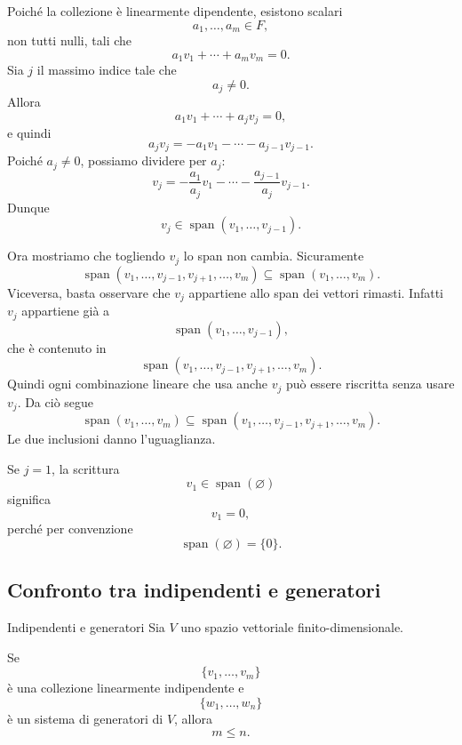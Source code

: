 \documentclass[a4paper]{article}
\begin{document}
\begin{snippetproof}{}
    Poiché la collezione è linearmente dipendente, esistono scalari
    \[
        a_1,\ldots,a_m\in F,
    \]
    non tutti nulli, tali che
    \[
        a_1v_1+\cdots+a_mv_m=0.
    \]
    Sia \(j\) il massimo indice tale che
    \[
        a_j\neq 0.
    \]
    Allora
    \[
        a_1v_1+\cdots+a_jv_j=0,
    \]
    e quindi
    \[
        a_jv_j=-a_1v_1-\cdots-a_{j-1}v_{j-1}.
    \]
    Poiché \(a_j\neq 0\), possiamo dividere per \(a_j\):
    \[
        v_j
        =
        -\frac{a_1}{a_j}v_1-\cdots-\frac{a_{j-1}}{a_j}v_{j-1}.
    \]
    Dunque
    \[
        v_j\in\operatorname{span}(v_1,\ldots,v_{j-1}).
    \]

    Ora mostriamo che togliendo \(v_j\) lo span non cambia. Sicuramente
    \[
        \operatorname{span}(v_1,\ldots,v_{j-1},v_{j+1},\ldots,v_m)
        \subseteq
        \operatorname{span}(v_1,\ldots,v_m).
    \]
    Viceversa, basta osservare che \(v_j\) appartiene allo span dei vettori rimasti. Infatti \(v_j\) appartiene già a
    \[
        \operatorname{span}(v_1,\ldots,v_{j-1}),
    \]
    che è contenuto in
    \[
        \operatorname{span}(v_1,\ldots,v_{j-1},v_{j+1},\ldots,v_m).
    \]
    Quindi ogni combinazione lineare che usa anche \(v_j\) può essere riscritta senza usare \(v_j\). Da ciò segue
    \[
        \operatorname{span}(v_1,\ldots,v_m)
        \subseteq
        \operatorname{span}(v_1,\ldots,v_{j-1},v_{j+1},\ldots,v_m).
    \]
    Le due inclusioni danno l'uguaglianza.
\end{snippetproof}

Se \(j=1\), la scrittura
\[
    v_1\in\operatorname{span}(\varnothing)
\]
significa
\[
    v_1=0,
\]
perché per convenzione
\[
    \operatorname{span}(\varnothing)=\{0\}.
\]

\subsection{Confronto tra indipendenti e generatori}

\begin{snippettheorem}{Indipendenti e generatori}
    Sia \(V\) uno spazio vettoriale finito-dimensionale.

    Se
    \[
        \{v_1,\ldots,v_m\}
    \]
    è una collezione linearmente indipendente e
    \[
        \{w_1,\ldots,w_n\}
    \]
    è un sistema di generatori di \(V\), allora
    \[
        m\leq n.
    \]
\end{snippettheorem}
\end{document}
